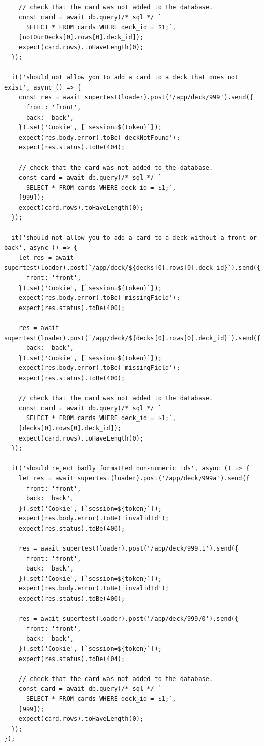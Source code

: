 \documentclass{report}
\begin{document}
\begin{verbatim}
    // check that the card was not added to the database.
    const card = await db.query(/* sql */ `
      SELECT * FROM cards WHERE deck_id = $1;`,
    [notOurDecks[0].rows[0].deck_id]);
    expect(card.rows).toHaveLength(0);
  });

  it('should not allow you to add a card to a deck that does not exist', async () => {
    const res = await supertest(loader).post('/app/deck/999').send({
      front: 'front',
      back: 'back',
    }).set('Cookie', [`session=${token}`]);
    expect(res.body.error).toBe('deckNotFound');
    expect(res.status).toBe(404);

    // check that the card was not added to the database.
    const card = await db.query(/* sql */ `
      SELECT * FROM cards WHERE deck_id = $1;`,
    [999]);
    expect(card.rows).toHaveLength(0);
  });

  it('should not allow you to add a card to a deck without a front or back', async () => {
    let res = await supertest(loader).post(`/app/deck/${decks[0].rows[0].deck_id}`).send({
      front: 'front',
    }).set('Cookie', [`session=${token}`]);
    expect(res.body.error).toBe('missingField');
    expect(res.status).toBe(400);

    res = await supertest(loader).post(`/app/deck/${decks[0].rows[0].deck_id}`).send({
      back: 'back',
    }).set('Cookie', [`session=${token}`]);
    expect(res.body.error).toBe('missingField');
    expect(res.status).toBe(400);

    // check that the card was not added to the database.
    const card = await db.query(/* sql */ `
      SELECT * FROM cards WHERE deck_id = $1;`,
    [decks[0].rows[0].deck_id]);
    expect(card.rows).toHaveLength(0);
  });

  it('should reject badly formatted non-numeric ids', async () => {
    let res = await supertest(loader).post('/app/deck/999a').send({
      front: 'front',
      back: 'back',
    }).set('Cookie', [`session=${token}`]);
    expect(res.body.error).toBe('invalidId');
    expect(res.status).toBe(400);

    res = await supertest(loader).post('/app/deck/999.1').send({
      front: 'front',
      back: 'back',
    }).set('Cookie', [`session=${token}`]);
    expect(res.body.error).toBe('invalidId');
    expect(res.status).toBe(400);

    res = await supertest(loader).post('/app/deck/999/0').send({
      front: 'front',
      back: 'back',
    }).set('Cookie', [`session=${token}`]);
    expect(res.status).toBe(404);

    // check that the card was not added to the database.
    const card = await db.query(/* sql */ `
      SELECT * FROM cards WHERE deck_id = $1;`,
    [999]);
    expect(card.rows).toHaveLength(0);
  });
});
\end{verbatim}
\end{document}
